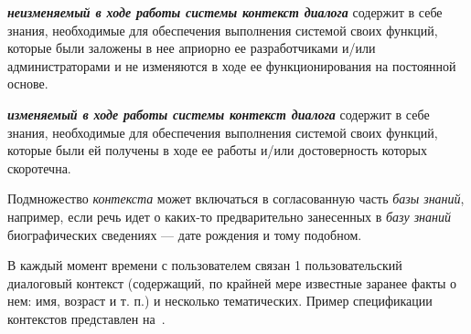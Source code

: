 \textbf{\textit{неизменяемый в ходе работы системы контекст диалога}} содержит в себе знания, необходимые для обеспечения выполнения системой своих функций,  которые были заложены в нее априорно ее разработчиками и/или администраторами и не изменяются в ходе ее функционирования на постоянной основе.

\textbf{\textit{изменяемый в ходе работы системы контекст диалога}} содержит в себе знания, необходимые для обеспечения выполнения системой своих функций,  которые были ей получены в ходе ее работы и/или достоверность которых скоротечна.

\begin{SCn}


    \begin{scnindent}
        \begin{scneqtoset}
        \end{scneqtoset}
    \end{scnindent}
    \begin{scnindent}
        \begin{scneqtoset}
        \end{scneqtoset}
    \end{scnindent}

\end{SCn}

Подмножество \textit{контекста} может включаться в согласованную часть \textit{базы знаний}, например, если речь идет о каких-то предварительно занесенных в \textit{базу знаний} биографических сведениях --- дате рождения и тому подобном.

В каждый момент времени с пользователем связан 1 пользовательский диалоговый контекст (содержащий, по крайней мере известные заранее факты о нем: имя, возраст и т. п.) и несколько тематических.
Пример спецификации контекстов представлен на~\textit{}.

